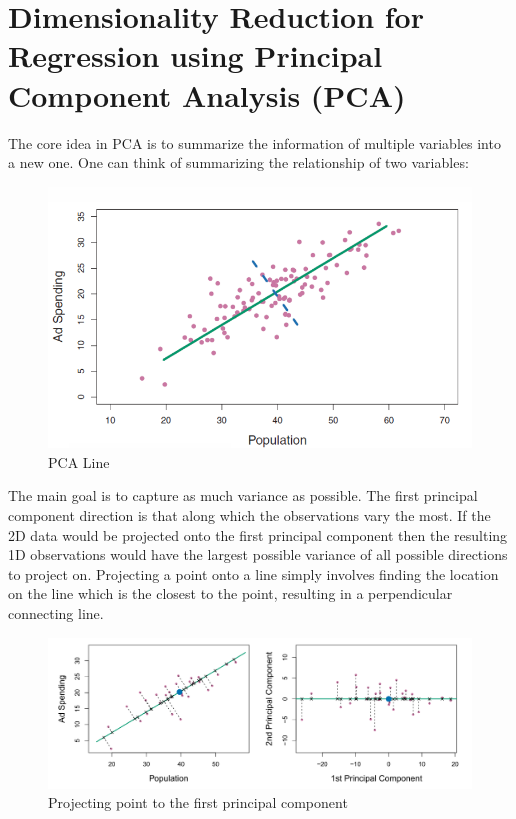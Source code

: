 \documentclass[../Main.tex]{subfiles}
\begin{document}
\newpage
\section{Dimensionality Reduction for Regression using Principal Component Analysis (PCA)}

The core idea in PCA is to summarize the information of multiple variables into a new one.
One can think of summarizing the relationship of two variables:

\begin{figure}[H]
    \centering
    \includegraphics[width=0.75\linewidth]{Images/pca-summarize-relation.png}
    \caption{PCA Line}
\end{figure}

The main goal is to capture as much variance as possible.
The first principal component direction is that along which the observations vary the most.
If the 2D data would be projected onto the first principal component 
then the resulting 1D observations would have the largest possible 
variance of all possible directions to project on.
Projecting a point onto a line simply involves finding the location on the 
line which is the closest to the point, resulting in a perpendicular connecting line.

\begin{figure}[H]
    \centering
    \includegraphics[width=0.75\linewidth]{Images/first-pc.png}
    \caption{Projecting point to the first principal component}
\end{figure}
\end{document}

